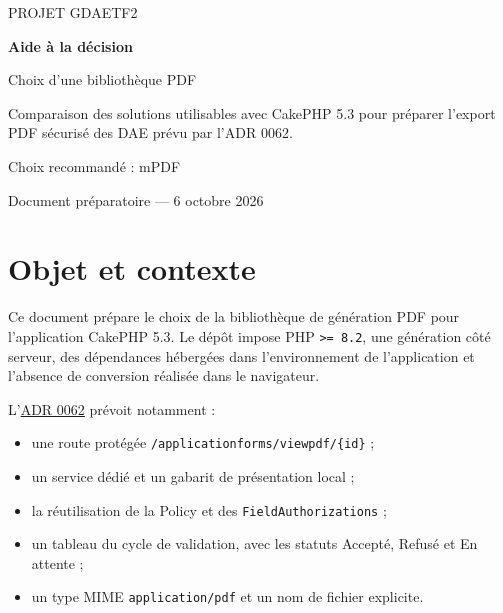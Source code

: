\documentclass[11pt,a4paper]{article}
\begin{document}
\begin{titlepage}
  \centering
  \vspace*{1.4cm}
  {\Large\textcolor{bleuDAE}{PROJET GDAETF2}\par}
  \vspace{1.1cm}
  {\Huge\bfseries\textcolor{bleuDAE}{Aide à la décision}\par}
  \vspace{0.35cm}
  {\LARGE\textcolor{grisTexteDAE}{Choix d'une bibliothèque PDF}\par}
  \vspace{1.2cm}
  \begin{tcolorbox}[enhanced,colback=bleuClairDAE,colframe=bleuDAE,boxrule=0.8pt,arc=2mm,width=0.88\textwidth]
    Comparaison des solutions utilisables avec CakePHP 5.3 pour préparer l'export PDF sécurisé des DAE prévu par l'ADR 0062.
  \end{tcolorbox}
  \vfill
  {\large\textcolor{vertDAE}{Choix recommandé : mPDF}\par}
  \vspace{0.3cm}
  {\small Document préparatoire — 6 octobre 2026\par}
\end{titlepage}

\tableofcontents
\clearpage

\section{Objet et contexte}

Ce document prépare le choix de la bibliothèque de génération PDF pour
l'application CakePHP 5.3. Le dépôt impose PHP \texttt{>= 8.2}, une génération
côté serveur, des dépendances hébergées dans l'environnement de l'application
et l'absence de conversion réalisée dans le navigateur.

L'\href{run:../../adr/0062-export-pdf-applicationform.md}{ADR 0062}
prévoit notamment :

\begin{itemize}
  \item une route protégée \texttt{/applicationforms/viewpdf/\{id\}} ;
  \item un service dédié et un gabarit de présentation local ;
  \item la réutilisation de la Policy et des \texttt{FieldAuthorizations} ;
  \item un tableau du cycle de validation, avec les statuts Accepté, Refusé et En attente ;
  \item un type MIME \texttt{application/pdf} et un nom de fichier explicite.
\end{itemize}
\end{document}
